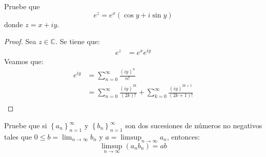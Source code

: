 \documentclass[12pt]{report}
\newcounter{it}
\theoremstyle{largebreak}
\begin{document}
    \begin{excer}
        Pruebe que
        \begin{equation*}
            e^z=e^x(\cos y+i\sin y)
        \end{equation*}
        donde $z=x+iy$.
    \end{excer}

    \begin{proof}
        Sea $z\in\mathbb{C}$. Se tiene que:
        \begin{equation*}
            \begin{split}
                e^z&=e^{x}e^{iy}
            \end{split}
        \end{equation*}
        Veamos que:
        \begin{equation*}
            \begin{split}
                e^{ iy}&=\sum_{n=0}^\infty\frac{(iy)^n}{n!}\\
                &=\sum_{n=0}^\infty\frac{(iy)^{2k}}{(2k)!}+\sum_{k=0}^\infty\frac{(iy)^{2k+1}}{(2k+1)!}\\
            \end{split}
        \end{equation*}
    \end{proof}

    \begin{excer}
        \label{productoSucesionesLimSupLim}
        Pruebe que si $\left\{a_n\right\}_{ n=1}^\infty$ y $\left\{b_n\right\}_{ n=1}^\infty$ son dos sucesiones de números no negativos tales que $0\leq b=\lim_{ n\rightarrow\infty}b_n$ y $a=\limsup_{ n\rightarrow\infty}a_n$, entonces:
        \begin{equation*}
            \limsup_{ n\rightarrow\infty}(a_nb_n)=ab
        \end{equation*}
    \end{excer}
\end{document}
